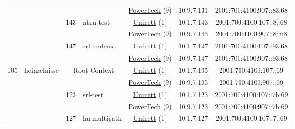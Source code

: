 \begin{small}
\begin{center}
\begin{longtable}{|c|c|c|c|c|c|c|c|}
  &  &  &  & \multicolumn{2}{|c|}{\tiny{\href{http://www.powertech.no}{PowerTech} (9)}} & \tiny{10.9.7.131} & \tiny{2001:700:4100:907::83:68} \\* \cline{3-3}\cline{4-4}\cline{5-5}\cline{6-6}\cline{7-7}\cline{8-8}
  &  & \multirow{2}{*}{\tiny{143}} & \multicolumn{1}{|l|}{\multirow{2}{*}{\tiny{ntnu-test}}} & \multicolumn{2}{|c|}{\tiny{\href{https://www.uninett.no}{Uninett} (1)}} & \tiny{10.1.7.143} & \tiny{2001:700:4100:107::8f:68} \\* \cline{5-5}\cline{6-6}\cline{7-7}\cline{8-8}
  &  &  &  & \multicolumn{2}{|c|}{\tiny{\href{http://www.powertech.no}{PowerTech} (9)}} & \tiny{10.9.7.143} & \tiny{2001:700:4100:907::8f:68} \\* \cline{3-3}\cline{4-4}\cline{5-5}\cline{6-6}\cline{7-7}\cline{8-8}
  &  & \multirow{2}{*}{\tiny{147}} & \multicolumn{1}{|l|}{\multirow{2}{*}{\tiny{srl-nndemo}}} & \multicolumn{2}{|c|}{\tiny{\href{https://www.uninett.no}{Uninett} (1)}} & \tiny{10.1.7.147} & \tiny{2001:700:4100:107::93:68} \\* \cline{5-5}\cline{6-6}\cline{7-7}\cline{8-8}
  &  &  &  & \multicolumn{2}{|c|}{\tiny{\href{http://www.powertech.no}{PowerTech} (9)}} & \tiny{10.9.7.147} & \tiny{2001:700:4100:907::93:68} \\ \hline
 \multirow{12}{*}{\tiny{105}} & \multicolumn{1}{|l|}{\multirow{12}{*}{\tiny{heinzelnisse}}} & \multicolumn{2}{|c|}{\multirow{2}{*}{\tiny{Root Context}}} & \multicolumn{2}{|c|}{\tiny{\href{https://www.uninett.no}{Uninett} (1)}} & \tiny{10.1.7.105} & \tiny{2001:700:4100:107::69} \\* \cline{5-5}\cline{6-6}\cline{7-7}\cline{8-8}
  &  & \multicolumn{2}{|c|}{} & \multicolumn{2}{|c|}{\tiny{\href{http://www.powertech.no}{PowerTech} (9)}} & \tiny{10.9.7.105} & \tiny{2001:700:4100:907::69} \\* \cline{3-3}\cline{4-4}\cline{5-5}\cline{6-6}\cline{7-7}\cline{8-8}
  &  & \multirow{2}{*}{\tiny{123}} & \multicolumn{1}{|l|}{\multirow{2}{*}{\tiny{srl-test}}} & \multicolumn{2}{|c|}{\tiny{\href{https://www.uninett.no}{Uninett} (1)}} & \tiny{10.1.7.123} & \tiny{2001:700:4100:107::7b:69} \\* \cline{5-5}\cline{6-6}\cline{7-7}\cline{8-8}
  &  &  &  & \multicolumn{2}{|c|}{\tiny{\href{http://www.powertech.no}{PowerTech} (9)}} & \tiny{10.9.7.123} & \tiny{2001:700:4100:907::7b:69} \\* \cline{3-3}\cline{4-4}\cline{5-5}\cline{6-6}\cline{7-7}\cline{8-8}
  &  & \multirow{2}{*}{\tiny{127}} & \multicolumn{1}{|l|}{\multirow{2}{*}{\tiny{hu-multipath}}} & \multicolumn{2}{|c|}{\tiny{\href{https://www.uninett.no}{Uninett} (1)}} & \tiny{10.1.7.127} & \tiny{2001:700:4100:107::7f:69} \\* \cline{5-5}\cline{6-6}\cline{7-7}\cline{8-8}

\end{longtable}
\end{center}
\end{small}
